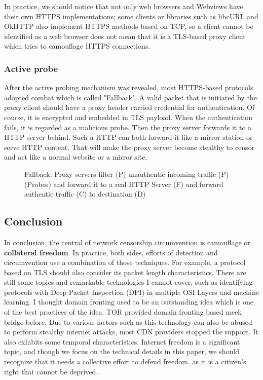 \documentclass[conference]{IEEEtran}
\begin{document}
In practice, we should notice that not only web browsers and Webviews have their own HTTPS implementations; some clients or libraries such as libcURL and OkHTTP also implement HTTPS methods based on TCP, so a client cannot be identified as a web browser does not mean that it is a TLS-based proxy client which tries to camouflage HTTPS connections.


\subsubsection{Active probe}\label{sec:apc}
After the active probing mechanism was revealed, most HTTPS-based protocols adopted combat which is called "Fallback". A valid packet that is initiated by the proxy client should have a proxy header carried credential for authentication. Of course, it is encrypted and embedded in TLS payload. When the authentication fails, it is regarded as a malicious probe. Then the proxy server forwards it to a HTTP server behind. Such a HTTP can both forward it like a mirror station or serve  HTTP content. That will make the proxy server become stealthy to censor and act like a normal website or a mirror site.

\begin{figure}[!h]
    \centering
    
    \caption{Fallback: Proxy servers filter (P) unauthentic incoming traffic (P) (Probes) and forward it to a real HTTP Server (F) and forward authentic traffic (C) to destination (D)}
    \label{fig:fallback}
\end{figure}

\subsection{Conclusion}
In conclusion, the central of network censorship circumvention is camouflage or \textbf{collateral freedom}. In practice, both sides, efforts of detection and circumvention use a combination of those techniques. For example, a protocol based on TLS should also consider its packet length characteristics. There are still some topics and remarkable technologies I cannot cover, such as identifying protocols with Deep Packet Inspection (DPI) in multiple OSI Layers and machine learning. I thought domain fronting used to be an outstanding idea which is one of the best practices of the idea.
TOR provided domain fronting \cite{domainfronting} based meek bridge \cite{meek} before. Due to various factors such as this technology can also be abused to perform stealthy internet attacks, most CDN providers stopped the support. It also exhibits some temporal characteristics. Internet freedom is a significant topic, and though we focus on the technical details in this paper, we should recognize that it needs a collective effort to defend freedom, as it is a citizen's right that cannot be deprived.
\end{document}
